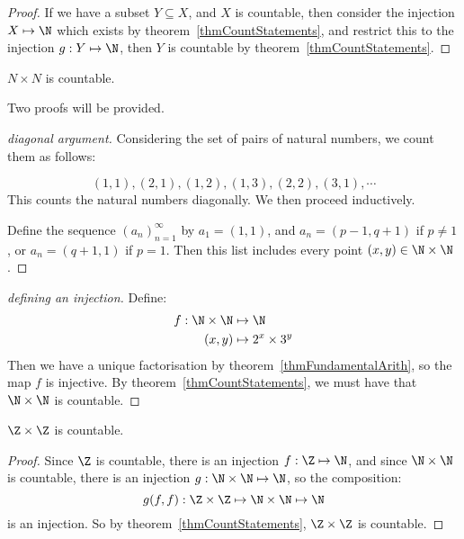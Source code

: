 \documentclass[../Main.tex]{subfiles}
\begin{document}
\begin{proof}
    If we have a subset $Y \subseteq X$, and $X$ is countable, then consider the injection $X \mapsto \N$ which exists by theorem~\ref{thmCountStatements}, and restrict this to the injection $g : Y \mapsto \N$, then $Y$ is countable by theorem~\ref{thmCountStatements}.
\end{proof}
\begin{theorem}
    $N \times N$ is countable.
    \label{thmDoubleNaturalCountable}
\end{theorem}
Two proofs will be provided.
\begin{proof}[diagonal argument]
    Considering the set of pairs of natural numbers, we count them as follows:\par
    \begin{equation*}
        (1, 1), (2, 1), (1, 2), (1, 3), (2, 2), (3, 1), \cdots
    \end{equation*}
    This counts the natural numbers diagonally. We then proceed inductively.\par
    Define the sequence $\left(a_n\right)^\infty_{n=1}$ by $a_1 = (1, 1)$, and $a_n = (p-1, q+1)$ if $p \neq 1$, or $a_n = (q+1, 1)$ if $p = 1$.
    Then this list includes every point $(x, y) \in \N \times \N$.
\end{proof}
\begin{proof}[defining an injection]
    Define:
    \begin{align*}
        f : \N \times \N &\mapsto \N \\
        (x, y) &\mapsto 2^x \times 3^y
    \end{align*}
    Then we have a unique factorisation by theorem~\ref{thmFundamentalArith}, so the map $f$ is injective. By theorem~\ref{thmCountStatements}, we must have that $\N \times \N$ is countable.
\end{proof}
\begin{corollary}
    $\Z \times \Z$ is countable.
    \label{corDoubleIntCountable}
\end{corollary}
\begin{proof}
    Since $\Z$ is countable, there is an injection $f : \Z \mapsto \N$, and since $\N \times \N$ is countable, there is an injection $g : \N \times \N \mapsto \N$, so the composition:
    \begin{equation*}
        g(f, f) : \Z \times \Z \mapsto \N \times \N \mapsto \N
    \end{equation*}
    is an injection. So by theorem~\ref{thmCountStatements}, $\Z \times \Z$ is countable.
\end{proof}
\end{document}
